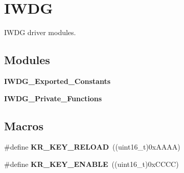 \section{I\+W\+DG}
\label{group__IWDG}


I\+W\+DG driver modules.  


\subsection*{Modules}
\begin{DoxyCompactItemize}
\item 
\textbf{ I\+W\+D\+G\+\_\+\+Exported\+\_\+\+Constants}
\item 
\textbf{ I\+W\+D\+G\+\_\+\+Private\+\_\+\+Functions}
\end{DoxyCompactItemize}
\subsection*{Macros}
\begin{DoxyCompactItemize}
\item 
\#define \textbf{ K\+R\+\_\+\+K\+E\+Y\+\_\+\+R\+E\+L\+O\+AD}~((uint16\+\_\+t)0x\+A\+A\+A\+A)
\item 
\#define \textbf{ K\+R\+\_\+\+K\+E\+Y\+\_\+\+E\+N\+A\+B\+LE}~((uint16\+\_\+t)0x\+C\+C\+C\+C)
\end{DoxyCompactItemize}
